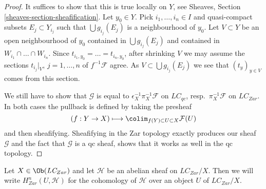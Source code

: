 \begin{proof}
\medskip\noindent
It suffices to show that this is true locally on $Y$, see
Sheaves, Section \ref{sheaves-section-sheafification}. Let $y_0 \in Y$.
Pick $i_1, \ldots, i_n \in I$ and
quasi-compact subsets $E_j \subset Y_{i_j}$ such that
$\bigcup g_{i_j}(E_j)$ is a neighbourhood of $y_0$.
Let $V \subset Y$ be an open neighbourhood of $y_0$ contained
in $\bigcup g_{i_j}(E_j)$ and contained in $W_{i_1} \cap \ldots \cap W_{i_n}$.
Since $t_{i_1, y_0} = \ldots = t_{i_n, y_0}$, after shrinking $V$
we may assume the sections $t_{i_j}|_V$, $j = 1, \ldots, n$ of
$f^{-1}\mathcal{F}$ agree. As $V \subset \bigcup g_{i_j}(E_j)$
we see that $(t_y)_{y \in V}$ comes from this section.

\medskip\noindent
We still have to show that $\mathcal{G}$ is equal to
$\epsilon_X^{-1}\pi_X^{-1}\mathcal{F}$ on $\textit{LC}_{qc}$,
resp.\ $\pi_X^{-1}\mathcal{F}$ on $\textit{LC}_{Zar}$.
In both cases the pullback is defined by taking the presheaf
$$
(f : Y \to X)
\longmapsto
\colim_{f(Y) \subset U \subset X} \mathcal{F}(U)
$$
and then sheafifying. Sheafifying in the Zar topology
exactly produces our sheaf $\mathcal{G}$ and the fact
that $\mathcal{G}$ is a qc sheaf, shows that it works as well
in the qc topology.
\end{proof}

\noindent
Let $X \in \Ob(\textit{LC}_{Zar})$ and let $\mathcal{H}$
be an abelian sheaf on $\textit{LC}_{Zar}/X$. 
Then we will write $H^n_{Zar}(U, \mathcal{H})$ for the cohomology
of $\mathcal{H}$ over an object $U$ of $\textit{LC}_{Zar}/X$.

